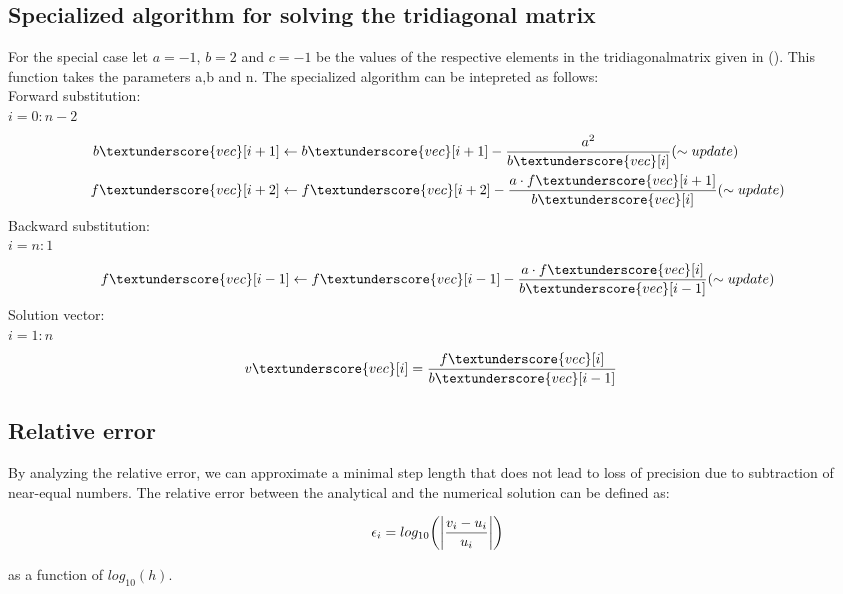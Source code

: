 \documentclass{article}
\begin{document}
\subsection{Specialized algorithm for solving the tridiagonal matrix}
For the special case let $a = -1$, $b = 2$ and $c = -1$ be the values of the respective elements in the tridiagonalmatrix given in (). This function takes the parameters a,b and n. The specialized algorithm can be intepreted as follows: \\
Forward substitution:\\
$i=0:n-2$
\begin{align*}
b\textunderscore{vec}[i+1] & \leftarrow b\textunderscore{vec}[i+1]  - \frac{a^2}{b\textunderscore{vec}[i]}     (\sim update)\\
f\textunderscore{vec}[i+2] &\leftarrow f\textunderscore{vec}[i+2]  - \frac{a \cdot f\textunderscore{vec}[i+1]}{b\textunderscore{vec}[i]}      (\sim update)\\
\end{align*}
Backward substitution: \\
$i = n:1 $
\begin{align*}
f\textunderscore{vec}[i-1] & \leftarrow f\textunderscore{vec}[i-1] - \frac{a \cdot f\textunderscore{vec}[i]}{b\textunderscore{vec}[i-1]}      (\sim update)\\
\end{align*}
Solution vector:\\
$i =1:n$
\begin{align*}
v\textunderscore{vec}[i] & = \frac{f\textunderscore{vec}[i]}{b\textunderscore{vec}[i-1]}
\end{align*}

\subsection{Relative error}

By analyzing the relative error, we can approximate a minimal step length that does not lead to loss of precision due to subtraction of near-equal numbers. The relative error between the analytical and the numerical solution can be defined as:

\begin{equation}
	\epsilon_{i} = log_{10}\bigg(\abs{\frac{v_i-u_i}{u_i}}\bigg)
	\label{eq:8}
\end{equation}

as a function of $log_{10}(h)$.
\end{document}
